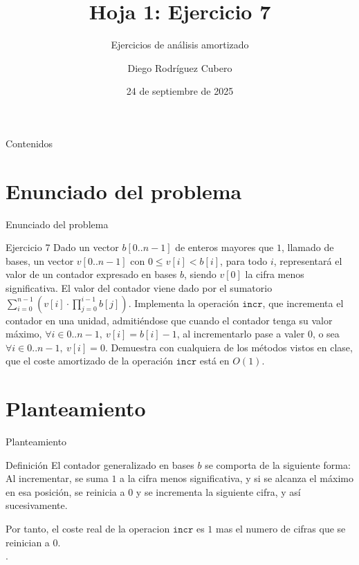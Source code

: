 \documentclass[aspectratio=169]{beamer}
\title{Hoja 1: Ejercicio 7}
\subtitle{Ejercicios de análisis amortizado}
\author{Diego Rodríguez Cubero}
\institute{UCM}
\date{24 de septiembre de 2025}
\begin{document}
\begin{frame}
    \titlepage
\end{frame}

\begin{frame}{Contenidos}
    \tableofcontents
\end{frame}

\section{Enunciado del problema}
\begin{frame}{Enunciado del problema}
    \begin{block}{Ejercicio 7}
        Dado un vector $b[0..n-1]$ de enteros mayores que $1$, llamado de bases, un vector $v[0..n-1]$ con $0 \leq v[i] < b[i]$, para todo $i$, representará el valor de un contador expresado en bases $b$, siendo $v[0]$ la cifra menos significativa. El valor del contador viene dado por el sumatorio $\sum_{i=0}^{n-1} \left(v[i] \cdot \prod_{j=0}^{i-1} b[j]\right)$. Implementa la operación $\texttt{incr}$, que incrementa el contador en una unidad, admitiéndose que cuando el contador tenga su valor máximo, $\forall i \in 0..n-1,\ v[i] = b[i] - 1$, al incrementarlo pase a valer $0$, o sea $\forall i \in 0..n-1,\ v[i] = 0$. Demuestra con cualquiera de los métodos vistos en clase, que el coste amortizado de la operación $\texttt{incr}$ está en $O(1)$.
    \end{block}
\end{frame}

\section{Planteamiento}
\begin{frame}{Planteamiento}
    \begin{exampleblock}{Definición}
        El contador generalizado en bases $b$ se comporta de la siguiente forma:\\
        Al incrementar, se suma $1$ a la cifra menos significativa, y si se alcanza el máximo en esa posición, se reinicia a $0$ y se incrementa la siguiente cifra, y así sucesivamente.
    \end{exampleblock}
    Por tanto, el coste real de la operacion $\texttt{incr}$ es $1$ mas el numero de cifras que se reinician a $0$.\\.
\end{frame}
\end{document}

